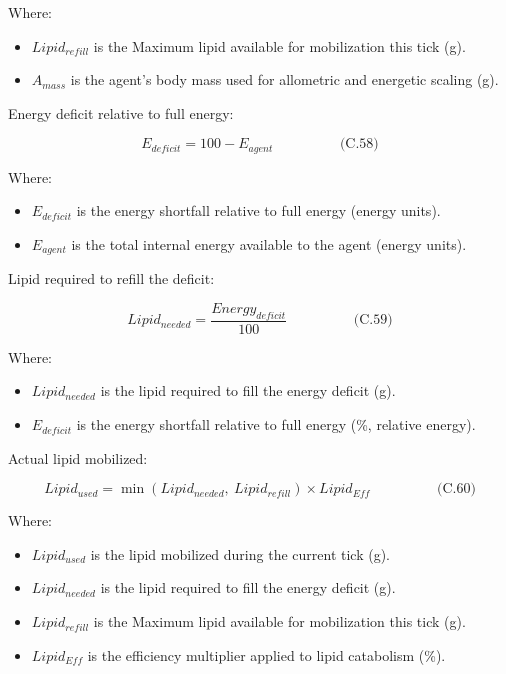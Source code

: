 \documentclass[
]{book}
\providecommand{\tightlist}{%
  \setlength{\itemsep}{0pt}\setlength{\parskip}{0pt}}
\begin{document}
Where:

\begin{itemize}
\tightlist
\item
  \(Lipid_{refill}\) is the Maximum lipid available for mobilization
  this tick (g).
\item
  \(A_{mass}\) is the agent's body mass used for allometric and
  energetic scaling (g).
\end{itemize}

Energy deficit relative to full energy:

\[
\begin{equation} E_{deficit} = 100 - E_{agent}  \hspace{2cm} \text{(C.58)} \end{equation}
\]

Where:

\begin{itemize}
\tightlist
\item
  \(E_{deficit}\) is the energy shortfall relative to full energy
  (energy units).
\item
  \(E_{agent}\) is the total internal energy available to the agent
  (energy units).
\end{itemize}

Lipid required to refill the deficit:

\[
\begin{equation} Lipid_{needed} = \frac{Energy_{deficit}}{100}  \hspace{2cm} \text{(C.59)} \end{equation}
\]

Where:

\begin{itemize}
\tightlist
\item
  \(Lipid_{needed}\) is the lipid required to fill the energy deficit
  (g).
\item
  \(E_{deficit}\) is the energy shortfall relative to full energy (\%,
  relative energy).
\end{itemize}

Actual lipid mobilized:

\[
\begin{equation} Lipid_{used} = \min(Lipid_{needed},\ Lipid_{refill}) \times Lipid_{Eff}  \hspace{2cm} \text{(C.60)} \end{equation}
\]

Where:

\begin{itemize}
\tightlist
\item
  \(Lipid_{used}\) is the lipid mobilized during the current tick (g).
\item
  \(Lipid_{needed}\) is the lipid required to fill the energy deficit
  (g).
\item
  \(Lipid_{refill}\) is the Maximum lipid available for mobilization
  this tick (g).
\item
  \(Lipid_{Eff}\) is the efficiency multiplier applied to lipid
  catabolism (\%).
\end{itemize}
\end{document}
